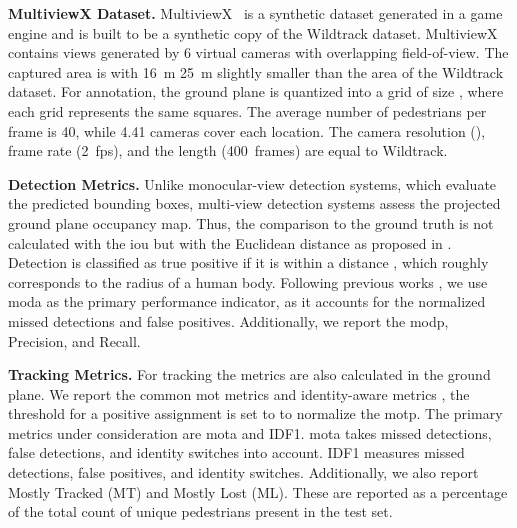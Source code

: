 \documentclass[10pt,twocolumn,letterpaper]{article}
\newcommand{\nparagraph}[1]{\noindent\textbf{#1.  }}
\begin{document}
{\nparagraph{MultiviewX Dataset} MultiviewX~\cite{hou2020multiview} is a synthetic dataset generated in a game engine and is built to be a synthetic copy of the Wildtrack dataset.
MultiviewX contains views generated by 6 virtual cameras with overlapping field-of-view. The captured area is with \qty{16}{\metre}  \qty{25}{\metre} slightly smaller than the area of the Wildtrack dataset. For annotation, the ground plane is quantized into a grid of size , where each grid represents the same  squares. The average number of pedestrians per frame is 40, while 4.41 cameras cover each location. The camera resolution (), frame rate (\qty{2}{fps}), and the length (\qty{400}{frames}) are equal to Wildtrack.

\nparagraph{Detection Metrics}
Unlike monocular-view detection systems, which evaluate the predicted bounding boxes, multi-view detection systems assess the projected ground plane occupancy map. Thus, the comparison to the ground truth is not calculated with the \gls{iou} but with the Euclidean distance as proposed in \cite{chavdarova2018wildtrack}. Detection is classified as true positive if it is within a distance , which roughly corresponds to the radius of a human body. Following previous works \cite{chavdarova2018wildtrack, hou2020multiview}, we use \gls{moda} as the primary performance indicator, as it accounts for the normalized missed detections and false positives. Additionally, we report the \gls{modp}, Precision, and Recall.

\nparagraph{Tracking Metrics}
For tracking the metrics are also calculated in the ground plane. We report the common \gls{mot} metrics \cite{bernardin2008evaluating} and identity-aware metrics \cite{ristani2016performance}, the threshold for a positive assignment is set to  to normalize the \gls{motp}. The primary metrics under consideration are \gls{mota} and IDF1.
\gls{mota} takes missed detections, false detections, and identity switches into account. IDF1 measures missed detections, false positives, and identity switches.
Additionally, we also report Mostly Tracked (MT) and Mostly Lost (ML). These are reported as a percentage of the total count of unique pedestrians present in the test set.

}
\end{document}
